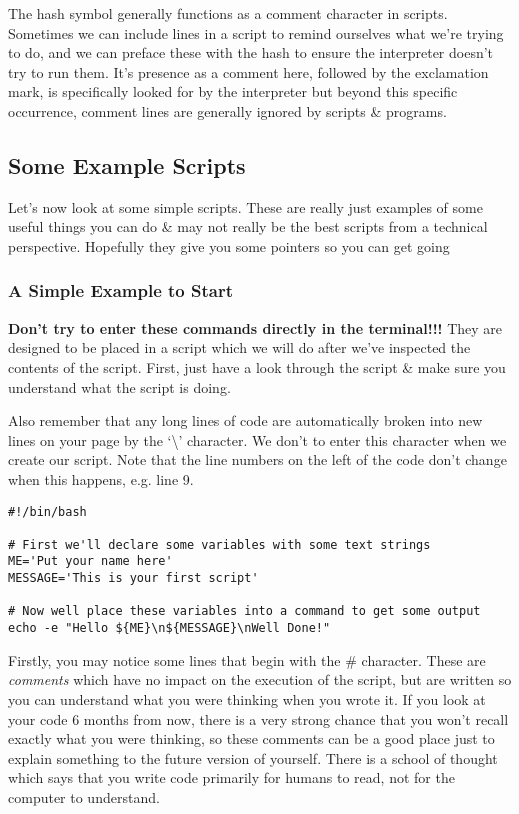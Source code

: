 \begin{note}
The hash symbol generally functions as a comment character in scripts.
Sometimes we can include lines in a script to remind ourselves what we're trying to do, and we can preface these with the hash to ensure the interpreter doesn't try to run them.
It's presence as a comment here, followed by the exclamation mark, is specifically looked for by the interpreter but beyond this specific occurrence, comment lines are generally ignored by scripts \& programs.
\end{note}

\subsection{Some Example Scripts}
Let's now look at some simple scripts.
These are really just examples of some useful things you can do \& may not really be the best scripts from a technical perspective.
Hopefully they give you some pointers so you can get going


\subsubsection*{A Simple Example to Start}
\begin{warning}
\textbf{Don't try to enter these commands directly in the terminal!!!}
They are designed to be placed in a script which we will do after we've inspected the contents of the script.
First,  just have a look through the script \& make sure you understand what the script is doing.

Also remember that any long lines of code are automatically broken into new lines on your page by the `\textbackslash ' character.
We don't to enter this character when we create our script.
Note that the line numbers on the left of the code don't change when this happens, e.g. line 9.
\end{warning}

\begin{lstlisting}[style=command_syntax]
#!/bin/bash

# First we'll declare some variables with some text strings
ME='Put your name here'
MESSAGE='This is your first script'

# Now well place these variables into a command to get some output
echo -e "Hello ${ME}\n${MESSAGE}\nWell Done!"
\end{lstlisting}

\begin{information}
Firstly, you may notice some lines that begin with the \# character.
These are \textit{comments} which have no impact on the execution of the script, but are written so you can understand what you were thinking when you wrote it.
If you look at your code 6 months from now, there is a very strong chance that you won't recall exactly what you were thinking, so these comments can be a good place just to explain something to the future version of yourself.
There is a school of thought which says that you write code primarily for humans to read, not for the computer to understand.
\end{information}

